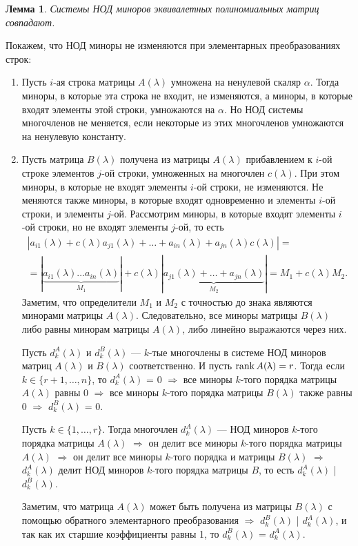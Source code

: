 \newtheorem*{lem12_2_1}{Лемма}\begin{lem12_2_1}Системы НОД миноров эквивалетных полиномиальных матриц совпадают.
\end{lem12_2_1}\begin{Proof}
	Покажем, что НОД миноры не изменяются при элементарных преобразованиях строк:
	\begin{enumerate}
		\item Пусть $i$-ая строка матрицы $A(\lambda)$ умножена на ненулевой скаляр $\alpha$. Тогда миноры, в которые эта строка не входит, не изменяются, а миноры, в которые входят элементы этой строки, умножаются на $\alpha$. Но НОД системы многочленов не меняется, если некоторые из этих многочленов умножаются на ненулевую константу.
		\item Пусть матрица $B(\lambda)$ получена из матрицы $A(\lambda)$ прибавлением к $i$-ой строке элементов $j$-ой строки, умноженных на многочлен $c(\lambda)$. При этом миноры, в которые не входят элементы $i$-ой строки, не изменяются. Не меняются также миноры, в которые входят одновременно и элементы $i$-ой строки, и элементы $j$-ой. Рассмотрим миноры, в которые входят элементы $i$-ой строки, но не входят элементы $j$-ой, то есть
		\begin{multline*}
			|a_{i1}(\lambda) + c(\lambda)a_{j1}(\lambda) + \ldots + a_{in}(\lambda) + a_{jn}(\lambda) c(\lambda)| =\\= |\underbrace{a_{i1}(\lambda) \dots a_{in}(\lambda)}_{M_1}| + c(\lambda)|\underbrace{a_{j1}(\lambda) +\ldots + a_{jn}(\lambda)}_{M_2}| = M_1 + c(\lambda)M_2.
		\end{multline*}		
		Заметим, что определители $M_1$ и $M_2$ с точностью до знака являются минорами матрицы $A(\lambda)$. Следовательно, все миноры матрицы $B(\lambda)$ либо равны минорам матрицы $A(\lambda)$, либо линейно выражаются через них.
		\par\bigskip
		
		Пусть $d^{A}_k (\lambda)$ и $d^{B}_k (\lambda)$ --- $k$-тые многочлены в системе НОД миноров матриц $A(\lambda)$ и $B(\lambda)$ соответственно. И пусть $\operatorname{rank}  A(\uplambda) = r$. Тогда если $k \in \{r+1, \dots, n\}$, то $d^{A}_k (\lambda)$ = 0 $\Rightarrow$ все миноры $k$-того порядка матрицы $A(\lambda)$ равны 0 $\Rightarrow$ все миноры $k$-того порядка матрицы $B(\lambda)$ также равны 0 $\Rightarrow$ $d^{B}_k (\lambda)$ = 0.
		
		Пусть $k \in \{1, \dots, r\}$. Тогда многочлен $d^{A}_k (\lambda)$ --- НОД миноров $k$-того порядка матрицы $A(\lambda)$ $\Rightarrow$ он делит все миноры $k$-того порядка матрицы $A(\lambda)$ $\Rightarrow$ он делит все миноры $k$-того порядка и матрицы $B(\lambda)$ $\Rightarrow$ $d^{A}_k (\lambda)$ делит НОД миноров $k$-того порядка матрицы $B$, то есть $d^{A}_k (\lambda)$ | $d^{B}_k (\lambda)$.
		
		Заметим, что матрица $A(\lambda)$ может быть получена из матрицы $B(\lambda)$ с помощью обратного элементарного преобразования $\Rightarrow$ $d^{B}_k (\lambda)$ | $d^{A}_k (\lambda)$, и так как их старшие коэффициенты равны 1, то $d^{B}_k (\lambda)$ = $d^{A}_k (\lambda)$. \end{enumerate}
\end{Proof} 
